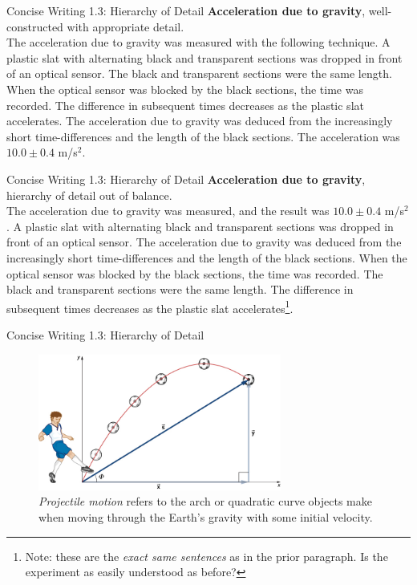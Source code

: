 \documentclass{beamer}
\begin{document}
\begin{frame}{Concise Writing 1.3: Hierarchy of Detail}
\textbf{Acceleration due to gravity}, well-constructed with appropriate detail. \\ \vspace{0.2cm}
The acceleration due to gravity was measured with the following technique.  A plastic slat with alternating black and transparent sections was dropped in front of an optical sensor.  The black and transparent sections were the same length.  When the optical sensor was blocked by the black sections, the time was recorded.  The difference in subsequent times decreases as the plastic slat accelerates.  The acceleration due to gravity was deduced from the increasingly short time-differences and the length of the black sections.  The acceleration was $10.0 \pm 0.4$ m/s$^2$.
\end{frame}

\begin{frame}{Concise Writing 1.3: Hierarchy of Detail}
\textbf{Acceleration due to gravity}, hierarchy of detail out of balance. \\ \vspace{0.2cm}
The acceleration due to gravity was measured, and the result was $10.0 \pm 0.4$ m/s$^2$.  A plastic slat with alternating black and transparent sections was dropped in front of an optical sensor.  The acceleration due to gravity was deduced from the increasingly short time-differences and the length of the black sections.  When the optical sensor was blocked by the black sections, the time was recorded.   The black and transparent sections were the same length.  The difference in subsequent times decreases as the plastic slat accelerates\footnote{Note: these are the \textit{exact same sentences} as in the prior paragraph.  Is the experiment as easily understood as before?}.
\end{frame}

\begin{frame}{Concise Writing 1.3: Hierarchy of Detail}
\begin{figure}
\includegraphics[width=8cm]{figures/soccer.jpeg}
\caption{\label{fig:soccer} \textit{Projectile motion} refers to the arch or quadratic curve objects make when moving through the Earth's gravity with some initial velocity.}
\end{figure}
\end{frame}
\end{document}
